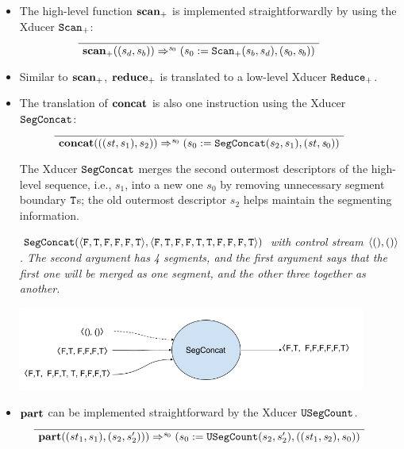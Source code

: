 \begin{itemize}
\item The high-level function $\mathbf{scan}_+$ is implemented straightforwardly by using the  Xducer $\mathtt{Scan}_{+}$:
	$$	\PT{
	\Axiom{\Transf{\*{scan}_+}{(s_d,s_b)}{\s_0}{}{\sfun{\sdef{s_0}{\genscan_{+}(s_b,s_d)}} {(\s_0,\s_b)}}}
}$$

\item Similar to $\mathbf{scan}_+$, $\mathbf{reduce}_+$  is translated to a low-level Xducer $\mathtt{Reduce}_{+}$.

\item The translation of $\mathbf{concat}$ is also one instruction using the Xducer $\mathtt{SegConcat}$:
$$	\PT{
	\Axiom{\Transf{\*{concat}}{((st,s_1),s_2)}{\s_0}{}{\sfun{\sdef{s_0}{\segconcat(s_2,s_1)}} {(st,\s_0)}}}
}$$


The Xducer $\mathtt{SegConcat}$ merges the second outermost descriptors of the high-level sequence, i.e., $s_1$, into a new one $s_0$ by removing unnecessary segment boundary $\mathtt{T}$s; the old outermost descriptor $s_2$ helps maintain the segmenting information.

\begin{example} \emph{$\segconcat(\<\F,\T,\F,\F,\F,\T\'>,\< \F,\T, \F,\F,\T,\T, \F,\F, \F,\T \'>)$ with control stream $\<(),()\'>$. The second argument has 4 segments, and the first argument says that the first one will be merged as one segment, and the other three together as another.}\\
	\begin{center}
		\includegraphics[width=0.9\textwidth]{fig/segconcat.png}
	\end{center}
\end{example}


\item $\mathbf{part}$ can be implemented straightforward by the Xducer $\mathtt{USegCount}$.
$$	\PT{
	\Axiom{\Transf{\*{part}}{(st_1,s_1),(s_2,s_2'))}{\s_0}{}{\sfun{\sdef{s_0}{\usegcount(s_2,s_2')}} {((\st_1,\s_2),s_0)}}}
}$$


\end{itemize}

